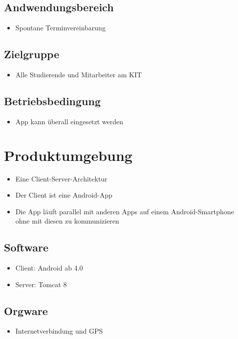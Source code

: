 \documentclass{scrartcl}
\begin{document}
	\subsection{Andwendungsbereich}
		\begin{itemize}	        
		\item Spontane Terminvereinbarung 
		\end{itemize}
		\subsection{Zielgruppe}
		\begin{itemize}	        
		\item Alle Studierende und Mitarbeiter am KIT
		\end{itemize}
		\subsection{Betriebsbedingung}
		\begin{itemize}	        
		\item App kann überall eingesetzt werden
		\end{itemize}

	\newpage
	

	\section{Produktumgebung}
	\begin{itemize}	        
		\item Eine Client-Server-Architektur
		\item Der Client ist eine Android-App
		\item Die App läuft parallel mit anderen Apps auf einem Android-Smartphone ohne mit diesen zu kommunizieren
		\end{itemize}
\subsection{Software}
		\begin{itemize}	        
		\item Client: Android ab 4.0
		\item Server: Tomcat 8
		\end{itemize}	
\subsection{Orgware}
		\begin{itemize}	        
		\item Internetverbindung und GPS
		\end{itemize}
\end{document}
